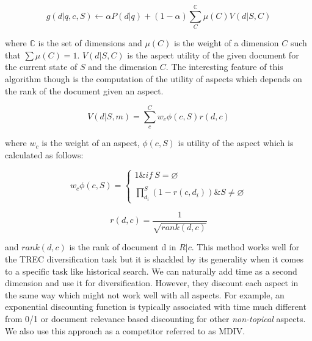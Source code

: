 \begin{equation}
  g(d|q, c, S) \leftarrow \alpha P(d|q) + (1-\alpha) \sum_C^{\mathbb{C}} \mu(C) V(d|S,C)
\end{equation}

where $\mathbb{C}$ is the set of dimensions and $\mu(C)$ is the weight of a dimension $C$ such that $\sum \mu(C) = 1$. $V(d|S,C)$ is the aspect utility of the given document for the current state of $S$ and the dimension $C$. The interesting feature of this algorithm though is the computation of the utility of aspects which depends on the rank of the document given an aspect.

\begin{equation}
   V(d|S,m) = \sum_c^C w_c\phi(c,S)r(d,c)
\end{equation}

where $w_c$ is the weight of an aspect, $\phi(c,S)$ is utility of the aspect which is calculated as follows:

\begin{equation}
  w_c\phi(c,S) = \left\{
  \begin{matrix}
    1\& if \: S=\varnothing  \\ 
    \\
    \prod_{d_i}^{S} (1-r(c,d_i)) \& S \neq \varnothing  
  \end{matrix}\right.
\end{equation}

\begin{equation}
  r(d,c) = \frac{1}{\sqrt{rank(d,c)}}
\end{equation}

and $rank(d,c)$ is the rank of document d in $R|c$. This method works well for the TREC diversification task but it is shackled by its generality when it comes to a specific task like historical search. We can naturally add time as a second dimension and use it for diversification. However, they discount each aspect in the same way which might not work well with all aspects. For example, an exponential discounting function is typically associated with time much different from 0/1 or document relevance based discounting for other \emph{non-topical} aspects. We also use this approach as a competitor referred to as \textsc{MDIV}.



